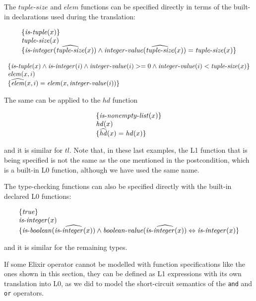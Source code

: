 The $\mathit{tuple\mbox{-}size}$ and $\mathit{elem}$ functions can be specified directly 
in terms of the built-in declarations used during the translation:

\[
\begin{array}{l}
\{ \mathit{is\mbox{-}tuple}(x) \}\\
\mathit{tuple\mbox{-}size}(x)\\
\{ \mathit{is\mbox{-}integer}(\widehat{\mathit{tuple\mbox{-}size}}(x)) \wedge 
  \mathit{integer\mbox{-}value}(\widehat{\mathit{tuple\mbox{-}size}}(x)) = \mathit{tuple\mbox{-}size}(x) \}
\end{array}
\]

\[
\begin{array}{l}
\{ \mathit{is\mbox{-}tuple}(x) \wedge \mathit{is\mbox{-}integer}(i) \wedge \mathit{integer\mbox{-}value}(i) >= 0 \wedge \mathit{integer\mbox{-}value}(i) < \mathit{tuple\mbox{-}size}(x) \}\\
\mathit{elem}(x, i)\\
\{ \widehat{\mathit{elem}}(x, i) = \mathit{elem}(x, \mathit{integer\mbox{-}value}(i)) \}
\end{array}
\]

The same can be applied to the $\mathit{hd}$ function

\[
\begin{array}{l}
\{ \mathit{is\mbox{-}nonempty\mbox{-}list}(x) \}\\
\mathit{hd}(x)\\
\{ \widehat{\mathit{hd}}(x) = \mathit{hd}(x) \}
\end{array}
\]

and it is similar for $\mathit{tl}$. Note that, in these last examples, the L1
function that is being specified is not the same as the one mentioned in the
postcondition, which is a built-in L0 function, although we have used the same
name.

The type-checking functions can also be specified directly with the built-in
declared L0 functions:

\[
\begin{array}{l}
\{ \mathit{true} \}\\
\mathit{is\mbox{-}integer}(x)\\
\{ \mathit{is\mbox{-}boolean}(\widehat{\mathit{is\mbox{-}integer}(x)}) \wedge 
  \mathit{boolean\mbox{-}value}(\widehat{\mathit{is\mbox{-}integer}(x)}) \Leftrightarrow \mathit{is\mbox{-}integer}(x) \}
\end{array}
\]

and it is similar for the remaining types.

If some Elixir operator cannot be modelled with function specifications like the
ones shown in this section, they can be defined as L1 expressions with its own 
translation into L0, as we did to model the short-circuit semantics of the 
\verb|and| and \verb|or| operators.

